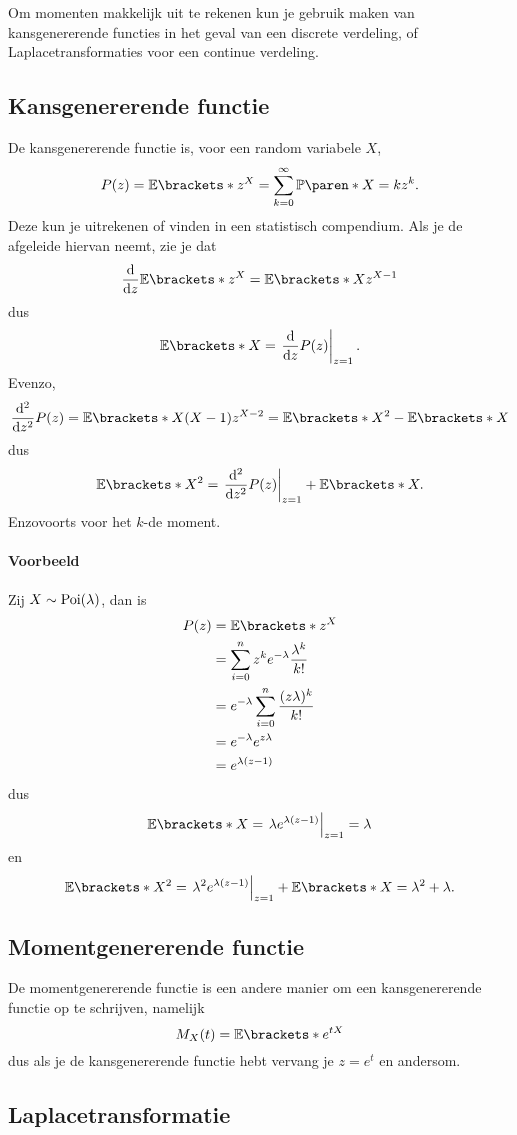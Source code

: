 Om momenten makkelijk uit te rekenen kun je gebruik maken van kansgenererende functies in het geval van een discrete verdeling, of Laplacetransformaties voor een continue verdeling.

\subsection{Kansgenererende functie}

De kansgenererende functie is, voor een random variabele $X$,
\[
    P(z) = \E{z^X} = \sum_{k=0}^\infty \P{X=k} z^k.
\]
Deze kun je uitrekenen of vinden in een statistisch compendium.
Als je de afgeleide hiervan neemt, zie je dat
\[
    \frac{\d}{\d z} \E{z^X} = \E{Xz^{X-1}}
\]
dus
\[
    \E{X} = \eval{\frac{\d}{\d z} P(z)}_{z=1}.
\]
Evenzo,
\[
    \frac{\d^2}{\d z^2} P(z) = \E{X(X-1)z^{X-2}} = \E{X^2} - \E{X}
\]
dus
\[
    \E{X^2} = \eval{\frac{\d^2}{\d z^2} P(z)}_{z=1} + \E{X}.
\]
Enzovoorts voor het $k$-de moment.

\paragraph{Voorbeeld}
Zij $X \sim \operatorname{Poi}(\lambda)$, dan is
\begin{align*}
    P(z) &= \E{z^X} \\
    &= \sumin z^k e^{-\lambda} \frac{\lambda^k}{k!} \\
    &= e^{-\lambda} \sumin \frac{(z\lambda)^k}{k!} \\
    &= e^{-\lambda} e^{z\lambda} \\
    &= e^{\lambda (z-1)}
\end{align*}
dus
\[
    \E{X} = \eval{\lambda e^{\lambda (z-1)}}_{z=1} = \lambda
\]
en
\[
    \E{X^2} = \eval{\lambda^2 e^{\lambda (z-1)}}_{z=1} + \E{X} = \lambda^2 + \lambda .
\]

\subsection{Momentgenererende functie}

De momentgenererende functie is een andere manier om een kansgenererende functie op te schrijven, namelijk
\[
    M_X(t) = \E{e^{tX}}
\]
dus als je de kansgenererende functie hebt vervang je $z=e^t$ en andersom.

\subsection{Laplacetransformatie}

